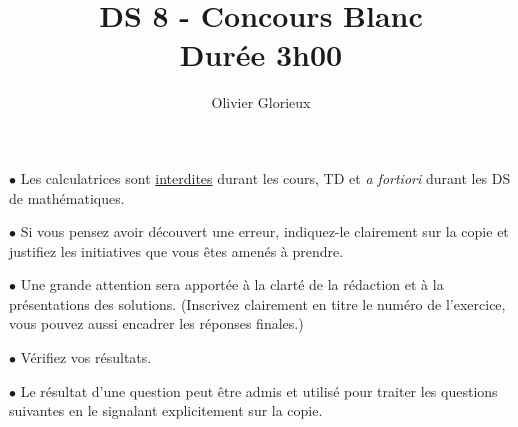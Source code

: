 \documentclass[a4paper, 11pt,reqno]{article}
\author{Olivier Glorieux}
\begin{document}
\title{DS 8 - Concours Blanc\\
\Large{Durée 3h00}
}

\vspace{1cm}
\begin{center}

\begin{description}
\item$\bullet$ Les calculatrices sont \underline{interdites} durant les cours, TD et \emph{a fortiori} durant les DS de mathématiques. \\

\item $\bullet $ Si vous pensez avoir découvert une erreur, indiquez-le clairement sur la copie et justifiez les initiatives que vous êtes amenés à prendre. \\

\item $\bullet$ Une grande attention sera apportée à la clarté de la rédaction et à la présentations des solutions. (Inscrivez clairement en titre le numéro de l'exercice, vous pouvez aussi encadrer les réponses finales.)  \\

\item $\bullet$ Vérifiez vos résultats. \\

\item $\bullet$ Le résultat d'une question peut être admis et utilisé pour traiter les questions suivantes en le signalant explicitement sur la copie. 
\end{description}

\end{center} 
\vspace{1cm}




\newpage

%
%
\end{document}
